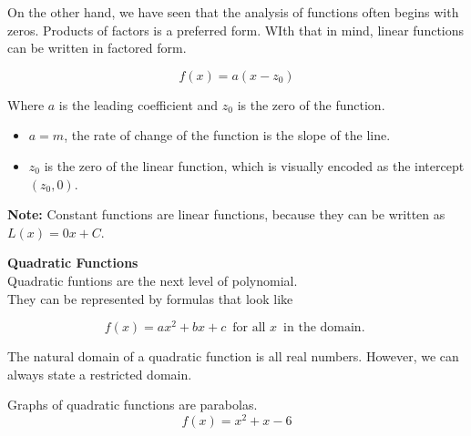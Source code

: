 \documentclass{ximera}
\begin{document}
On the other hand, we have seen that the analysis of functions often begins with zeros.  Products of factors is a preferred form.  WIth that in mind, linear functions can be written in factored form.


\[  f(x) = a (x - z_0)  \]

Where $a$ is the leading coefficient and $z_0$ is the zero of the function.





\begin{itemize}

\item $a = m$, the rate of change of the function is the slope of the line.

\item $z_0$ is the zero of the linear function, which is visually encoded as the intercept $(z_0, 0)$.

\end{itemize}



\textbf{Note:} Constant functions are linear functions, because they can be written as $L(x) = 0 x + C$. \\












\begin{template}  \textbf{\textcolor{blue!55!black}{Quadratic Functions}} \\



Quadratic funtions are the next level of polynomial. \\


They can be represented by formulas that look like


\[ f(x) = a x^2 + b x + c  \,  \text{ for all } x  \, \text{ in the domain. }   \]



\end{template}



The natural domain of a quadratic function is all real numbers.  However, we can always state a restricted domain.







Graphs of quadratic functions are parabolas. 
\[ f(x) = x^2 + x - 6\]
\end{document}
